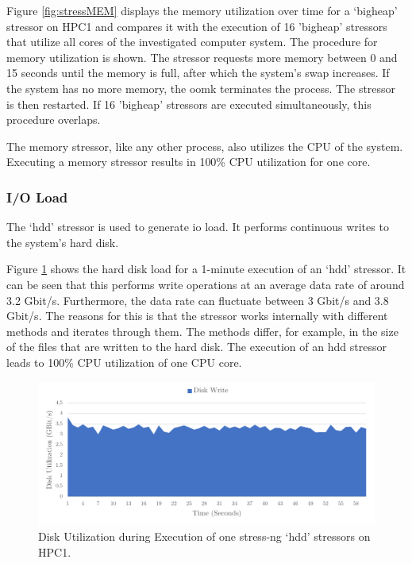 Figure \ref{fig:stressMEM} displays the memory utilization over time for a `bigheap' stressor on HPC1 and compares it with the execution of 16 'bigheap' stressors that utilize all cores of the investigated computer system. The procedure for memory utilization is shown. The stressor requests more memory between 0 and 15 seconds until the memory is full, after which the system's swap increases. If the system has no more memory, the \ac{oomk} terminates the process. The stressor is then restarted. If 16 'bigheap' stressors are executed simultaneously, this procedure overlaps.

The memory stressor, like any other process, also utilizes the \ac{CPU} of the system. Executing a memory stressor results in 100\% \ac{CPU} utilization for one core.

\subsubsection{I/O Load} \label{chap:stressngIO}
The `hdd' stressor is used to generate \ac{io} load. It performs continuous writes to the system's hard disk.

Figure \ref{fig:stressIO} shows the hard disk load for a 1-minute execution of an `hdd' stressor. It can be seen that this performs write operations at an average data rate of around 3.2 Gbit/s. Furthermore, the data rate can fluctuate between 3 Gbit/s and 3.8 Gbit/s. The reasons for this is that the stressor works internally with different methods and iterates through them. The methods differ, for example, in the size of the files that are written to the hard disk. The execution of an hdd stressor leads to 100\% \ac{CPU} utilization of one \ac{CPU} core.

\begin{figure}[h!]
    \centering
    \includegraphics[width=1\linewidth]{figures/method/stress4.pdf}
    \caption{Disk Utilization during Execution of one stress-ng `hdd' stressors on HPC1.}
    \label{fig:stressIO}
\end{figure}

